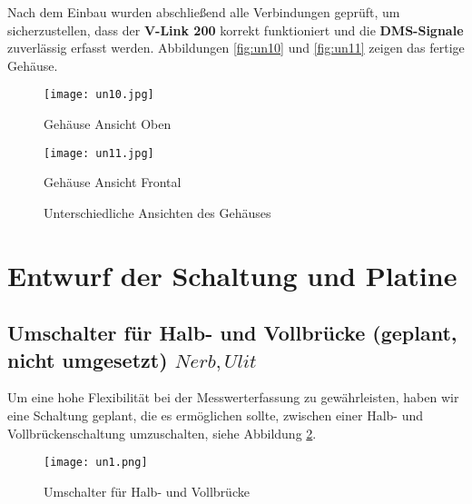 Nach dem Einbau wurden abschließend alle Verbindungen geprüft, um sicherzustellen, dass der \textbf{V-Link 200} korrekt funktioniert und die \textbf{DMS-Signale} zuverlässig erfasst werden.
Abbildungen \ref{fig:un10} und \ref{fig:un11} zeigen das fertige Gehäuse.
\begin{figure}[htbp]
    \centering
    \begin{minipage}{0.48\textwidth}
        \centering
        \texttt{[image: un10.jpg]}
        \caption[Geh\"ause Ansicht Oben (Abbildungsverzeichnis)]{Geh\"ause Ansicht Oben}
        \label{fig:un10}
    \end{minipage}
    \hfill
    \begin{minipage}{0.48\textwidth}
        \centering
        \texttt{[image: un11.jpg]}
        \caption[Geh\"ause Ansicht Frontal (Abbildungsverzeichnis)]{Geh\"ause Ansicht Frontal}
        \label{fig:un11}
    \end{minipage}
    \caption{Unterschiedliche Ansichten des Gehäuses}
    \label{fig:gehaeuse_ansichten}
\end{figure}



\clearpage
\section{Entwurf der Schaltung und Platine}



\subsection{Umschalter f\"ur Halb- und Vollbr\"ucke (geplant, nicht umgesetzt) \(Nerb, Ulit\)}
Um eine hohe Flexibilität bei der Messwerterfassung zu gewährleisten, haben wir eine Schaltung geplant, die es ermöglichen sollte, zwischen einer Halb- und Vollbrückenschaltung umzuschalten, siehe Abbildung \ref{fig:un1}.
\begin{figure}[h]
    \begin{center}
        \texttt{[image: un1.png]}
        \caption[Umschalter f\"ur Halb- und Vollbr\"ucke (Abbildungsverzeichnis)]{Umschalter f\"ur Halb- und Vollbr\"ucke}
        
        \label{fig:un1}
    \end{center}
\end{figure}

